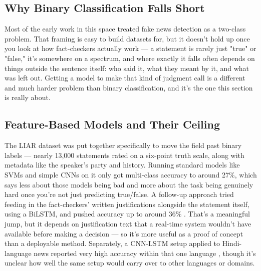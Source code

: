 \documentclass[a4paper,fleqn]{cas-sc}
\begin{document}
\subsection{Why Binary Classification Falls Short}
Most of the early work in this space treated fake news detection as a two-class problem. That framing is easy to build datasets for, but it doesn't hold up once you look at how fact-checkers actually work — a statement is rarely just "true" or "false," it's somewhere on a spectrum, and where exactly it falls often depends on things outside the sentence itself: who said it, what they meant by it, and what was left out. Getting a model to make that kind of judgment call is a different and much harder problem than binary classification, and it's the one this section is really about.

\subsection{Feature-Based Models and Their Ceiling}
The LIAR dataset was put together specifically to move the field past binary labels \citep{wang2017liar} — nearly 13,000 statements rated on a six-point truth scale, along with metadata like the speaker's party and history. Running standard models like SVMs and simple CNNs on it only got multi-class accuracy to around 27\%, which says less about those models being bad and more about the task being genuinely hard once you're not just predicting true/false. A follow-up approach tried feeding in the fact-checkers' written justifications alongside the statement itself, using a BiLSTM, and pushed accuracy up to around 36\% \citep{alhindi2018where}. That's a meaningful jump, but it depends on justification text that a real-time system wouldn't have available before making a decision — so it's more useful as a proof of concept than a deployable method. Separately, a CNN-LSTM setup applied to Hindi-language news reported very high accuracy within that one language \citep{gupta2025fake}, though it's unclear how well the same setup would carry over to other languages or domains.
\end{document}
